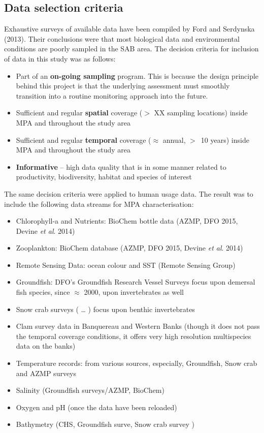 \documentclass[letterpaper,portrait,11pt]{scrartcl}
\numberwithin{equation}{section}		%
\numberwithin{figure}{section}		%
\numberwithin{table}{section}				%
\begin{document}
\subsection{Data selection criteria}
Exhaustive surveys of available data have been compiled by Ford and Serdynska (2013). Their conclusions were that most biological data and environmental conditions are poorly sampled in the SAB area. The decision criteria for inclusion of data in this study was as follows:

\begin{itemize}
	\item Part of an \textbf{on-going sampling} program. This is because the design principle behind this project is that the underlying assessment must smoothly transition into a routine monitoring approach into the future.
  \item	Sufficient and regular \textbf{spatial} coverage ($>$ XX sampling locations) inside MPA and throughout the study area
  \item Sufficient and regular \textbf{temporal} coverage ($\approx$ annual, $>$~10 years) inside MPA and throughout the study area
  \item \textbf{Informative} -- high data quality that is in some manner related to productivity, biodiversity, habitat and species of interest
\end{itemize}

The same decision criteria were applied to human usage data. The result was to include the following data streams for MPA characterisation:

\begin{itemize}
	\item Chlorophyll-a and Nutrients: BioChem bottle data (AZMP, DFO 2015, Devine \textit{et al}. 2014) 
  \item Zooplankton: BioChem database (AZMP, DFO 2015, Devine \textit{et al}. 2014) 
  \item Remote Sensing Data: ocean colour and SST (Remote Sensing Group)
  \item Groundfish: DFO's Groundfish Research Vessel Surveys focus upon demersal fish species, since $\approx$ 2000, upon invertebrates as well
  \item Snow crab surveys ( \ldots{} ) focus upon benthic invertebrates
  \item Clam survey data in Banquereau and Western Banks (though it does not pass the temporal coverage conditions, it offers very high resolution multispecies data on the banks)
  \item Temperature records: from various sources, especially, Groundfish, Snow crab and AZMP surveys
  \item Salinity (Groundfish surveys/AZMP, BioChem)
  \item Oxygen and pH (once the data have been reloaded)
  \item Bathymetry (CHS, Groundfish surve, Snow crab survey )
\end{itemize}
\end{document}
